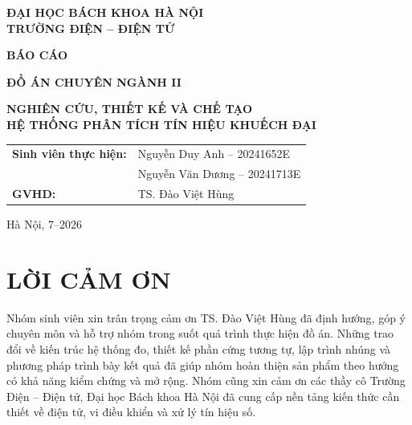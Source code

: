\documentclass[12pt,a4paper]{report}
\renewcommand{\arraystretch}{1.2}
\begin{document}
\begin{titlepage}

    \begin{center}
        \vspace*{0.5cm}
        \large \textbf{ĐẠI HỌC BÁCH KHOA HÀ NỘI}\\
        \large \textbf{TRƯỜNG ĐIỆN -- ĐIỆN TỬ}

        \vspace{2.2cm}
        \Huge \textbf{BÁO CÁO}

        \vspace{1.5cm}
        \large \textbf{ĐỒ ÁN CHUYÊN NGÀNH II}

        \vspace{1cm}
        {\Large \textbf{NGHIÊN CỨU, THIẾT KẾ VÀ CHẾ TẠO\\[0.2cm]
        HỆ THỐNG PHÂN TÍCH TÍN HIỆU KHUẾCH ĐẠI}}

        \vspace{2.2cm}
        \begin{table}[h]
            \centering
            \large
            \renewcommand{\arraystretch}{1.3}
            \begin{tabular}{ll}
                \textbf{Sinh viên thực hiện:} & Nguyễn Duy Anh -- 20241652E \\
                                               & Nguyễn Văn Dương -- 20241713E \\[0.5cm]
                \textbf{GVHD:} & TS. Đào Việt Hùng
            \end{tabular}
        \end{table}

        \vfill
        \large Hà Nội, 7--2026
        \vspace*{0.5cm}
    \end{center}
\end{titlepage}


\chapter*{LỜI CẢM ƠN}
Nhóm sinh viên xin trân trọng cảm ơn TS. Đào Việt Hùng đã định hướng, góp ý chuyên môn và hỗ trợ nhóm trong suốt quá trình thực hiện đồ án. Những trao đổi về kiến trúc hệ thống đo, thiết kế phần cứng tương tự, lập trình nhúng và phương pháp trình bày kết quả đã giúp nhóm hoàn thiện sản phẩm theo hướng có khả năng kiểm chứng và mở rộng. Nhóm cũng xin cảm ơn các thầy cô Trường Điện -- Điện tử, Đại học Bách khoa Hà Nội đã cung cấp nền tảng kiến thức cần thiết về điện tử, vi điều khiển và xử lý tín hiệu số.
\end{document}
